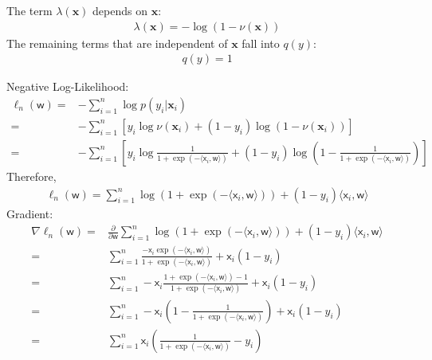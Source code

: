 \documentclass[10pt]{article}
\newcommand{\xv}{\mathbf{x}}
\newcommand{\inner}[2]{\langle #1, #2 \rangle}
\newcommand{\xbs}{\bm{\mathsf{x}}}
\newcommand{\wbs}{\bm{\mathsf{w}}}
\begin{document}
\begin{exercise}
\begin{enumerate}
          The term $\lambda(\xv)$ depends on $\xv$:
          \begin{align}
            \boxed{\lambda(\xv) = -\log (1 - \nu(\xv))}
          \end{align}
          The remaining terms that are independent of $\xv$ fall into $q(y)$:
          \begin{align}
            \boxed{q(y) = 1}
          \end{align}

          Negative Log-Likelihood:
          \begin{equation*}
            \begin{aligned}
              \ell_n(\wbs) = & -\sum_{i=1}^n \log p(y_i | \xv_i)                                                                                                        \\
              =              & -\sum_{i=1}^n \left[ y_i \log \nu(\xv_i) + (1-y_i) \log (1-\nu(\xv_i)) \right]                                                           \\
              =              & -\sum_{i=1}^n \left[ y_i \log \frac{1}{1+\exp(-\inner{\xbs_i}{\wbs})} + (1-y_i) \log (1-\frac{1}{1+\exp(-\inner{\xbs_i}{\wbs})}) \right]
            \end{aligned}
          \end{equation*}
          Therefore,
          \begin{align}
            \boxed{\ell_n(\wbs)=\sum_{i=1}^n \log(1+\exp(-\inner{\xbs_i}{\wbs}))+(1-y_i)\inner{\xbs_i}{\wbs}}
          \end{align}
          Gradient:
          \begin{equation*}
            \begin{aligned}
              \nabla \ell_n(\wbs) = & \frac{\partial}{\partial\wbs}\sum_{i=1}^n \log(1+\exp(-\inner{\xbs_i}{\wbs}))+(1-y_i)\inner{\xbs_i}{\wbs} \\
              =                     & \sum_{i=1}^n \frac{-\xbs_i\exp(-\inner{\xbs_i}{\wbs})}{1+\exp(-\inner{\xbs_i}{\wbs})}+\xbs_i(1-y_i)       \\
              =                     & \sum_{i=1}^n -\xbs_i\frac{1+\exp(-\inner{\xbs_i}{\wbs})-1}{1+\exp(-\inner{\xbs_i}{\wbs})}+\xbs_i(1-y_i)   \\
              =                     & \sum_{i=1}^n -\xbs_i\left(1-\frac{1}{1+\exp(-\inner{\xbs_i}{\wbs})}\right)+\xbs_i(1-y_i)                  \\
              =                     & \sum_{i=1}^n \xbs_i\left(\frac{1}{1+\exp(-\inner{\xbs_i}{\wbs})}-y_i\right)

\end{aligned}
\end{equation*}
\end{enumerate}
\end{exercise}
\end{document}
